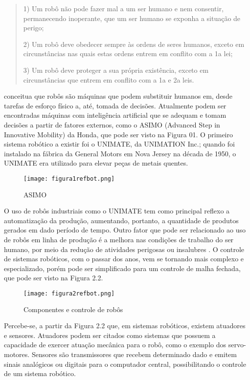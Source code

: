 \begin{quote}
1) Um robô não pode fazer mal a um ser humano e nem consentir, permanecendo inoperante, que um ser humano se exponha a situação de perigo;

2) Um robô deve obedecer sempre às ordens de seres humanos, exceto em circunstâncias nas quais estas ordens entrem em conflito com a 1a lei; 

3) Um robô deve proteger a sua própria existência, exceto em circunstâncias que entrem em conflito com a 1a e 2a leis. 
\end{quote}	

\cite{siciliano2010} conceitua que robôs são máquinas que podem substituir humanos em, desde tarefas de esforço físico a, até, tomada de decisões. Atualmente podem ser encontradas máquinas com inteligência artificial que se adequam e tomam decisões a partir de fatores externos, como o ASIMO (Advanced Step in Innovative Mobility) da Honda, que pode ser visto na Figura 01. O primeiro sistema robótico a existir foi o UNIMATE, da UNIMATION Inc.; quando foi instalado na fábrica da General Motors em Nova Jersey na década de 1950, o UNIMATE era utilizado para elevar peças de metais quentes.

\begin{figure}[h!]												
	\centering												
	\texttt{[image: figura1refbot.png]}			
	\caption{ASIMO}		
	\label{img:denavit}	
\end{figure}


O uso de robôs industriais como o UNIMATE tem como principal reflexo a automatização da produção, aumentando, portanto, a quantidade de produtos gerados em dado período de tempo. Outro fator que pode ser relacionado ao uso de robôs em linha de produção é a melhora nas condições de trabalho do ser humano, por meio da redução de atividades perigosas ou insalubres \cite{bouteille}.
O controle de sistemas robóticos, com o passar dos anos, vem se tornando mais complexo e especializado, porém pode ser simplificado para um controle de malha fechada, que pode ser visto na Figura 2.2.

\begin{figure}[h!]												
	\centering												
	\texttt{[image: figura2refbot.png]}			
	\caption{Componentes e controle de robôs}		
	\label{img:denavit}	
\end{figure}

Percebe-se, a partir da Figura 2.2 que, em sistemas robóticos, existem atuadores e sensores. Atuadores podem ser citados como sistemas que possuem a capacidade de exercer atuação mecânica para o robô, como o exemplo dos servo-motores. Sensores são transmissores que recebem determinado dado e emitem sinais analógicos ou digitais para o computador central, possibilitando o controle de um sistema robótico. 





